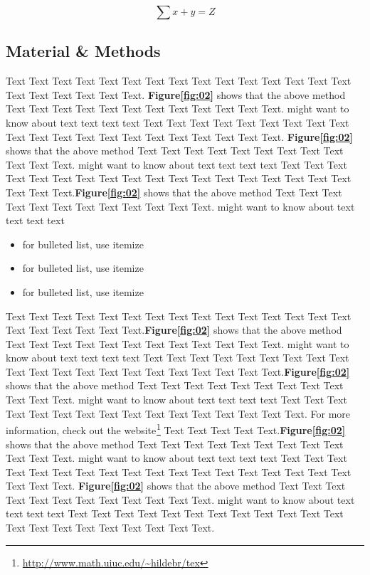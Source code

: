 \documentclass{bioinfo}
\begin{document}
\begin{equation}
\sum x+ y =Z\label{eq:01}
\end{equation}


\begin{methods}
\section{Material \& Methods}

Text Text Text Text Text Text  Text Text Text Text Text Text Text Text Text  Text Text Text Text Text Text. \textbf{Figure\ref{fig:02}} shows that the above method  Text Text Text Text  Text Text Text Text Text Text  Text Text.  \citealp{Boffelli03} might want to know about  text text text text
Text Text Text Text Text Text  Text Text Text Text Text Text Text Text Text  Text Text Text Text Text Text. \textbf{Figure\ref{fig:02}} shows that the above method  Text Text Text Text  Text Text Text Text Text Text  Text Text.  \citealp{Boffelli03} might want to know about  text text text text
Text Text Text Text Text Text  Text Text Text Text Text Text Text Text Text  Text Text Text Text Text Text.\textbf{Figure\ref{fig:02}} shows that the above method  Text Text Text Text  Text Text Text Text Text Text  Text Text.  \citealp{Boffelli03} might want to know about  text text text text

\begin{itemize}
\item for bulleted list, use itemize
\item for bulleted list, use itemize
\item for bulleted list, use itemize
\end{itemize}



Text Text Text Text Text Text  Text Text Text Text Text Text Text Text Text  Text Text Text Text Text Text.\textbf{Figure\ref{fig:02}} shows that the above method  Text Text Text Text  Text Text Text Text Text Text  Text Text.  \citealp{Boffelli03} might want to know about  text text text text
Text Text Text Text Text Text  Text Text Text Text Text Text Text Text Text  Text Text Text Text Text Text.\textbf{Figure\ref{fig:02}} shows that the above method  Text Text Text Text  Text Text Text Text Text Text  Text Text.  \citealp{Boffelli03} might want to know about  text text text text
Text Text Text Text Text Text  Text Text Text Text Text Text Text Text Text  Text. For more information, check out the {website$^{}$}\footnote{\url{http://www.math.uiuc.edu/~hildebr/tex}} Text Text Text Text Text.\textbf{Figure\ref{fig:02}} shows that the above method  Text Text Text Text  Text Text Text Text Text Text  Text Text.  \citealp{Boffelli03} might want to know about  text text text text
Text Text Text Text Text Text  Text Text Text Text Text Text Text Text Text  Text Text Text Text Text Text. \textbf{Figure\ref{fig:02}} shows that the above method  Text Text Text Text  Text Text Text Text Text Text  Text Text.  \citealp{Boffelli03} might want to know about  text text text text
Text Text Text Text Text Text  Text Text Text Text Text Text Text Text Text  Text Text Text Text Text Text.


\end{methods}
\end{document}
